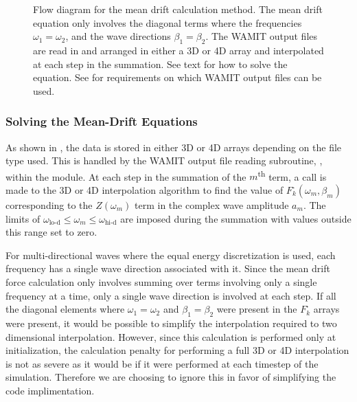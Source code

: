 \begin{figure}[ht]
   \begin{center}
         
      \endpgfgraphicnamed
   \end{center}
\caption{Flow diagram for the mean drift calculation method.  The mean drift equation only involves the diagonal terms where the frequencies $\omega_1 = \omega_2$, and the wave directions $\beta_1 = \beta_2$. 
The WAMIT output files are read in and arranged in either a 3D or 4D array and interpolated at each step in the summation.
See text for how to solve the equation. See  for requirements on which WAMIT output files can be used.
   \label{fig:MeanDrift:Flowchart}
}
\end{figure}


\subsubsection*{Solving the Mean-Drift Equations}
\label{sec:2ndOrdCalc:Diff:MeanDrift:solve}
As shown in , the data is stored in either 3D or 4D arrays depending on the file type used.  This is handled by the WAMIT output file reading subroutine, , within the  module.  At each step in the summation of the $m$\textsuperscript{th} term, a call is made to the 3D or 4D interpolation algorithm to find the value of $F^\text{-}_k (\omega_m, \beta_m)$ corresponding to the $Z (\omega_m)$ term in the complex wave amplitude $a_m$.  The limits of $\omega_\text{lo-d} \le \omega_m \le \omega_\text{hi-d}$ are imposed during the summation with values outside this range set to zero.

For multi-directional waves where the equal energy discretization is used, each frequency has a single wave direction associated with it.  Since the mean drift force calculation only involves summing over terms involving only a single frequency at a time, only a single wave direction is involved at each step.  If all the diagonal elements where $\omega_1 = \omega_2$ and $\beta_1 = \beta_2$ were present in the $F^\text{-}_k$ arrays were present, it would be possible to simplify the interpolation required to two dimensional interpolation.  However, since this calculation is performed only at initialization, the calculation penalty for performing a full 3D or 4D interpolation is not as severe as it would be if it were performed at each timestep of the simulation.  Therefore we are choosing to ignore this in favor of simplifying the code implimentation.


